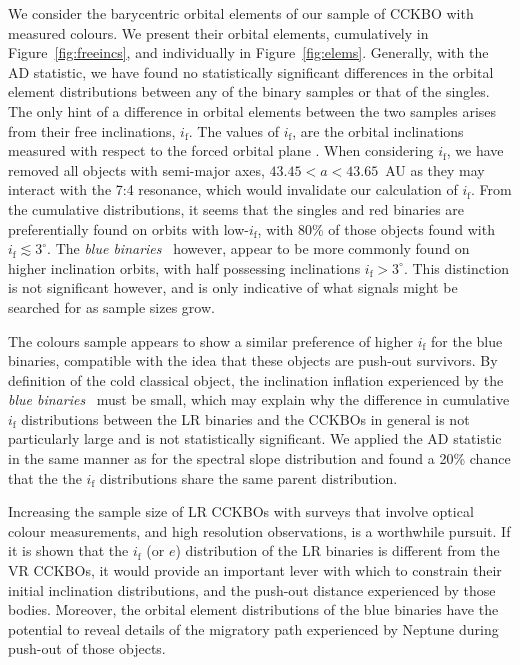 \documentclass[twocolumn]{aastex63}
\newcommand{\bluebinaries}{{\it blue binaries}}
\begin{document}
We consider the barycentric orbital elements of our sample of CCKBO with measured colours. We present their orbital elements, cumulatively in Figure~\ref{fig:freeincs}, and individually in Figure~\ref{fig:elems}. Generally, with the AD statistic, we have found no statistically significant differences in the orbital element distributions between any of the binary samples or that of the singles. The only hint of a difference in orbital elements between the two samples arises from their free inclinations, $i_\textrm{f}$. The values of $i_\textrm{f}$, are the orbital inclinations  measured with respect to the forced orbital plane \citep{vanLaerhoven2019}.  When considering $i_\textrm{f}$, we have removed all objects with semi-major axes, $43.45<a<43.65$~AU as they may interact with the 7:4 resonance, which would invalidate our calculation of $i_\textrm{f}$. From the cumulative distributions, it seems that the singles and red binaries are preferentially found on orbits with low-$i_\textrm{f}$, with 80\% of those objects found with $i_\textrm{f}\lesssim3^\circ$. The \bluebinaries~ however, appear to be more commonly found on higher inclination orbits, with half possessing inclinations $i_\textrm{f}>3^\circ$. This distinction is not significant however, and is only indicative of what signals might be searched for as sample sizes grow.

The colours sample appears to show a similar preference of higher $i_{\textrm{f}}$ for the blue binaries, compatible with the idea that these objects are push-out survivors. By definition of the cold classical object, the inclination inflation experienced by the \bluebinaries~ must be small, which may explain why the difference in cumulative $i_\textrm{f}$ distributions between the LR binaries and the CCKBOs in general is not particularly large and is not statistically significant. We applied the AD statistic in the same manner as for the spectral slope distribution and found a 20\% chance that the the $i_\textrm{f}$ distributions share the same parent distribution. 

Increasing the sample size of LR CCKBOs with surveys that involve optical colour measurements, and high resolution observations, is a worthwhile pursuit. If it is shown that the $i_\textrm{f}$ (or $e$) distribution of the LR binaries is different from the VR CCKBOs, it would provide an important lever with which to constrain their initial inclination distributions, and the push-out distance experienced by those bodies. Moreover, the orbital element distributions of the blue binaries have the potential to reveal details of the migratory path experienced by Neptune during push-out of those objects. 
\end{document}
